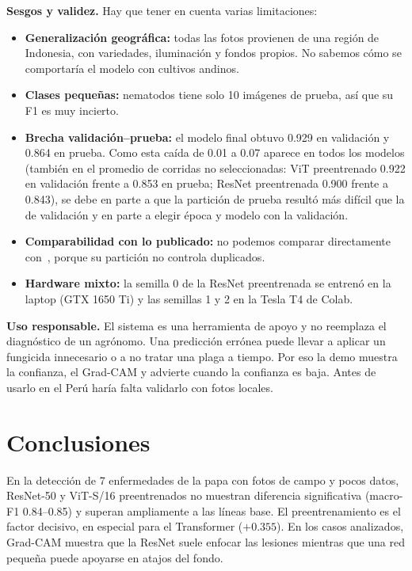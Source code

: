 \documentclass[conference,a4paper]{IEEEtran}
\begin{document}
\textbf{Sesgos y validez.} Hay que tener en cuenta varias limitaciones:
\begin{itemize}
\item \textbf{Generalización geográfica:} todas las fotos provienen de una región de Indonesia, con variedades, iluminación y fondos propios. No sabemos cómo se comportaría el modelo con cultivos andinos.
\item \textbf{Clases pequeñas:} nematodos tiene solo 10 imágenes de prueba, así que su F1 es muy incierto.
\item \textbf{Brecha validación--prueba:} el modelo final obtuvo 0.929 en validación y 0.864 en prueba. Como esta caída de 0.01 a 0.07 aparece en todos los modelos (también en el promedio de corridas no seleccionadas: ViT preentrenado 0.922 en validación frente a 0.853 en prueba; ResNet preentrenada 0.900 frente a 0.843), se debe en parte a que la partición de prueba resultó más difícil que la de validación y en parte a elegir época y modelo con la validación.
\item \textbf{Comparabilidad con lo publicado:} no podemos comparar directamente con~\cite{shabrina2024potato}, porque su partición no controla duplicados.
\item \textbf{Hardware mixto:} la semilla 0 de la ResNet preentrenada se entrenó en la laptop (GTX 1650 Ti) y las semillas 1 y 2 en la Tesla T4 de Colab.
\end{itemize}

\textbf{Uso responsable.} El sistema es una herramienta de apoyo y no reemplaza el diagnóstico de un agrónomo. Una predicción errónea puede llevar a aplicar un fungicida innecesario o a no tratar una plaga a tiempo. Por eso la demo muestra la confianza, el Grad-CAM y advierte cuando la confianza es baja. Antes de usarlo en el Perú haría falta validarlo con fotos locales.

\section{Conclusiones}\label{sec:conclusions}
En la detección de 7 enfermedades de la papa con fotos de campo y pocos datos, ResNet-50 y ViT-S/16 preentrenados no muestran diferencia significativa (macro-F1 0.84--0.85) y superan ampliamente a las líneas base. El preentrenamiento es el factor decisivo, en especial para el Transformer ($+0.355$). En los casos analizados, Grad-CAM muestra que la ResNet suele enfocar las lesiones mientras que una red pequeña puede apoyarse en atajos del fondo.
\end{document}
